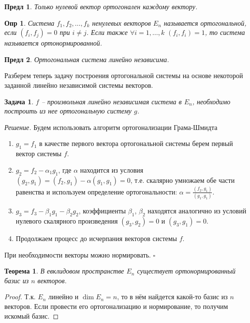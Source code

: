 \documentclass[a4paper,12pt]{article}
\newtheorem*{definition}{Опр}
\newtheorem{theorem}{Теорема}[section]
\newtheorem{propos}{Предл}[section]
\newtheorem*{prob}{Задача}
\newenvironment{soln}{\noindent\textit{Решение.}}{\hfill$\square$}
\begin{document}
\begin{propos}
	Только нулевой вектор ортогонален каждому вектору.
\end{propos}

\begin{definition}
	Система $f_1, f_2, \ldots, f_k$ ненулевых векторов $E_n$ называется ортогональной, если $(f_i, f_j) = 0$ при $i \ne j$. Если также $\forall i = 1, \ldots, k$ $(f_i, f_i) = 1$, то система называется ортонормированной.
\end{definition}

\begin{propos}
	Ортогональная система линейно независима.
\end{propos}

Разберем теперь задачу построения ортогональной системы на основе некоторой заданной линейно независимой системы векторов.

\begin{prob}
	$f$ -- произвольная линейно независимая система в $E_n$, необходимо построить из нее ортогональную систему $g$.
\end{prob}
\begin{soln}
	Будем использовать алгоритм ортогонализации Грама-Шмидта
	
	\begin{enumerate}
		\item $g_1 = f_1$ в качестве первого вектора ортогональной системы берем первый вектор системы $f$.
		\item $g_2 = f_2 - \alpha_1 g_1$, где $\alpha$ находится из условия $(g_2, g_1) = (f_2, g_1) - \alpha (g_1, g_1) = 0$, т.е. скалярно умножаем обе части равенства и используем определение ортогональности: $\alpha = \frac{(f_2, g_1)}{(g_1, g_1)}$.
		\item $g_3 = f_3 - \beta_1 g_1 - \beta_2 g_2$, коэффициенты $\beta_1$, $\beta_2$ находятся аналогично из условий нулевого скалярного произведения $(g_3, g_2) = 0$ и $(g_3, g_1) = 0$.
		\item Продолжаем процесс до исчерпания векторов системы $f$.		
	\end{enumerate}
	
	При необходимости векторы можно нормировать.
\end{soln}

\begin{theorem}
	В евклидовом пространстве $E_n$ существует ортонормированный базис из $n$ векторов.
\end{theorem}
\begin{proof}
	Т.к. $E_n$ линейно и $\dim E_n = n$, то в нём найдется какой-то базис из $n$ векторов. Если провести его ортогонализацию и нормирование, то получим искомый базис.
\end{proof}
\end{document}
